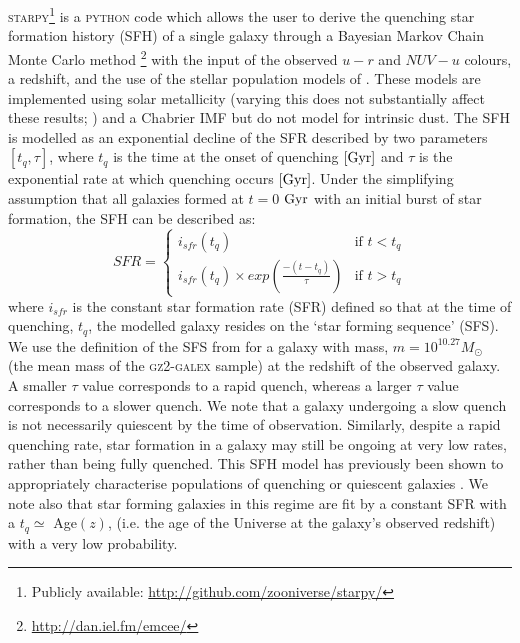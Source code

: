 \documentclass[useAMS,usenatbib]{mn2e}
\begin{document}
\textsc{starpy}\footnote{Publicly available: \url{http://github.com/zooniverse/starpy/}} is a \textsc{python} code which allows the user to derive the quenching star formation history (SFH) of a single galaxy through a Bayesian Markov Chain Monte Carlo method \citep{emcee13}\footnote{\url{http://dan.iel.fm/emcee/}} with the input of the observed $u-r$ and $NUV-u$ colours, a redshift, and the use of the stellar population models of \cite{BC03}.  These models are implemented using solar metallicity (varying this does not substantially affect these results; \citealt{smethurst15}) and a Chabrier IMF \citep{chabrier03} but do not model for intrinsic dust. The SFH is modelled as an exponential decline of the SFR described by two parameters $[t_{q}, \tau]$, where $t_{q}$ is the time at the onset of quenching $\rm{[Gyr]}$ and $\tau$ is the exponential rate at which quenching occurs $\rm{[Gyr]}$. Under the simplifying assumption that all galaxies formed at $t=0$ $\rm{ Gyr}$ with an initial burst of star formation, the SFH can be described as: 
\begin{equation}\label{sfh}
SFR =
\begin{cases}
i_{sfr}(t_{q}) & \text{if } t < t_{q} \\
i_{sfr}(t_{q}) \times exp{\left( \frac{-(t-t_{q})}{\tau}\right)} & \text{if } t > t_{q} 
\end{cases}
\end{equation}
where $i_{sfr}$ is the constant star formation rate (SFR) defined so that at the time of quenching, $t_{q}$, the modelled galaxy resides on the `star forming sequence' (SFS). We use the definition of the SFS from \cite{peng10} for a galaxy with mass, $m = 10^{10.27} M_{\odot}$ (the mean mass of the \textsc{gz2-galex} sample) at the redshift of the observed galaxy.  A smaller $\tau$ value corresponds to a rapid quench, whereas a larger $\tau$ value corresponds to a slower quench. We note that a galaxy undergoing a slow quench is not necessarily quiescent by the time of observation. Similarly, despite a rapid quenching rate, star formation in a galaxy may still be ongoing at very low rates, rather than being fully quenched. This SFH model has previously been shown to appropriately characterise populations of quenching or quiescent galaxies \citep{Weiner06, Martin07, Noeske07,schawinski14}. We note also that star forming galaxies in this regime are fit by a constant SFR with a $t_{q} \simeq$ Age$(z)$, (i.e. the age of the Universe at the galaxy's observed redshift) with a very low probability.
\end{document}

